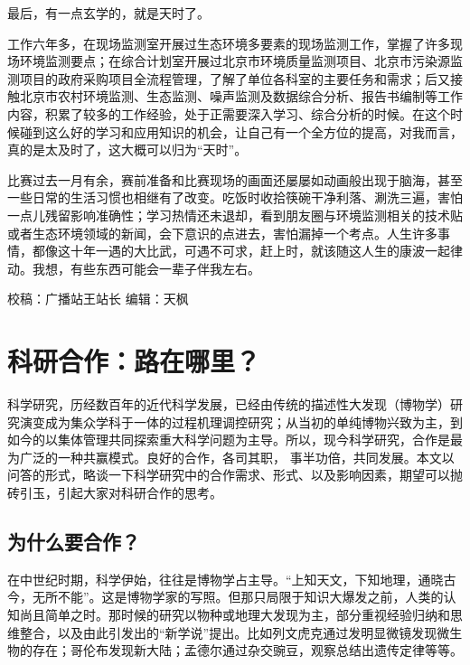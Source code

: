 \documentclass[]{book}
\begin{document}
最后，有一点玄学的，就是天时了。

工作六年多，在现场监测室开展过生态环境多要素的现场监测工作，掌握了许多现场环境监测要点；在综合计划室开展过北京市环境质量监测项目、北京市污染源监测项目的政府采购项目全流程管理，了解了单位各科室的主要任务和需求；后又接触北京市农村环境监测、生态监测、噪声监测及数据综合分析、报告书编制等工作内容，积累了较多的工作经验，处于正需要深入学习、综合分析的时候。在这个时候碰到这么好的学习和应用知识的机会，让自己有一个全方位的提高，对我而言，真的是太及时了，这大概可以归为``天时''。

比赛过去一月有余，赛前准备和比赛现场的画面还屡屡如动画般出现于脑海，甚至一些日常的生活习惯也相继有了改变。吃饭时收拾筷碗干净利落、涮洗三遍，害怕一点儿残留影响准确性；学习热情还未退却，看到朋友圈与环境监测相关的技术贴或者生态环境领域的新闻，会下意识的点进去，害怕漏掉一个考点。人生许多事情，都像这十年一遇的大比武，可遇不可求，赶上时，就该随这人生的康波一起律动。我想，有些东西可能会一辈子伴我左右。

校稿：广播站王站长
编辑：天枫

\hypertarget{ux79d1ux7814ux5408ux4f5cux8defux5728ux54eaux91cc}{%
\section{科研合作：路在哪里？}\label{ux79d1ux7814ux5408ux4f5cux8defux5728ux54eaux91cc}}

科学研究，历经数百年的近代科学发展，已经由传统的描述性大发现（博物学）研究演变成为集众学科于一体的过程机理调控研究；从当初的单纯博物兴致为主，到如今的以集体管理共同探索重大科学问题为主导。所以，现今科学研究，合作是最为广泛的一种共赢模式。良好的合作，各司其职， 事半功倍，共同发展。本文以问答的形式，略谈一下科学研究中的合作需求、形式、以及影响因素，期望可以抛砖引玉，引起大家对科研合作的思考。

\hypertarget{ux4e3aux4ec0ux4e48ux8981ux5408ux4f5c}{%
\subsection{为什么要合作？}\label{ux4e3aux4ec0ux4e48ux8981ux5408ux4f5c}}

在中世纪时期，科学伊始，往往是博物学占主导。``上知天文，下知地理，通晓古今，无所不能''。这是博物学家的写照。但那只局限于知识大爆发之前，人类的认知尚且简单之时。那时候的研究以物种或地理大发现为主，部分重视经验归纳和思维整合，以及由此引发出的``新学说''提出。比如列文虎克通过发明显微镜发现微生物的存在；哥伦布发现新大陆；孟德尔通过杂交豌豆，观察总结出遗传定律等等。
\end{document}
